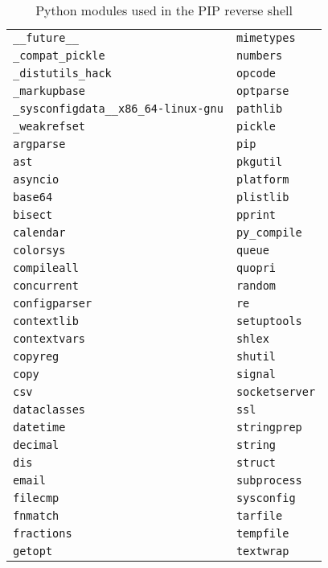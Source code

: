 \begin{longtable}{l l}
\caption{Python modules used in the PIP reverse shell}\label{tab:pip-dpd-mod} \\
\texttt{\_\_future\_\_} & \texttt{mimetypes} \\
\texttt{\_compat\_pickle} & \texttt{numbers} \\
\texttt{\_distutils\_hack} & \texttt{opcode} \\
\texttt{\_markupbase} & \texttt{optparse} \\
\texttt{\_sysconfigdata\_\_x86\_64-linux-gnu} & \texttt{pathlib} \\
\texttt{\_weakrefset} & \texttt{pickle} \\
\texttt{argparse} & \texttt{pip} \\
\texttt{ast} & \texttt{pkgutil} \\
\texttt{asyncio} & \texttt{platform} \\
\texttt{base64} & \texttt{plistlib} \\
\texttt{bisect} & \texttt{pprint} \\
\texttt{calendar} & \texttt{py\_compile} \\
\texttt{colorsys} & \texttt{queue} \\
\texttt{compileall} & \texttt{quopri} \\
\texttt{concurrent} & \texttt{random} \\
\texttt{configparser} & \texttt{re} \\
\texttt{contextlib} & \texttt{setuptools} \\
\texttt{contextvars} & \texttt{shlex} \\
\texttt{copyreg} & \texttt{shutil} \\
\texttt{copy} & \texttt{signal} \\
\texttt{csv} & \texttt{socketserver} \\
\texttt{dataclasses} & \texttt{ssl} \\
\texttt{datetime} & \texttt{stringprep} \\
\texttt{decimal} & \texttt{string} \\
\texttt{dis} & \texttt{struct} \\
\texttt{email} & \texttt{subprocess} \\
\texttt{filecmp} & \texttt{sysconfig} \\
\texttt{fnmatch} & \texttt{tarfile} \\
\texttt{fractions} & \texttt{tempfile} \\
\texttt{getopt} & \texttt{textwrap} \\

\end{longtable}
